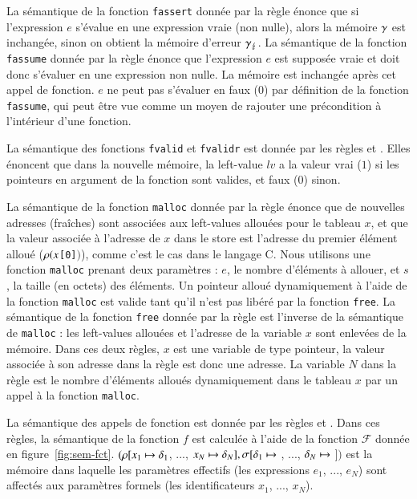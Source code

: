 La sémantique de la fonction \lstinline'fassert' donnée par la règle
 énonce que si l'expression $e$ s'évalue en une expression
vraie (non nulle), alors la mémoire $\gamma$ est inchangée, sinon on obtient
la mémoire d'erreur $\gamma_\lightning$.
La sémantique de la fonction \lstinline'fassume' donnée par la règle
 énonce que l'expression $e$ est supposée vraie et
doit donc s'évaluer en une expression non nulle.
La mémoire est inchangée après cet appel de fonction.
$e$ ne peut pas s'évaluer en faux ($0$) par définition de la fonction
\lstinline'fassume', qui peut être vue comme un moyen de rajouter une
précondition à l'intérieur d'une fonction.

La sémantique des fonctions \lstinline'fvalid' et \lstinline'fvalidr' est donnée
par les règles  et .
Elles énoncent que dans la nouvelle mémoire, la left-value $\mathit{lv}$ a
la valeur vrai ($1$) si les pointeurs en argument de la fonction sont valides,
et faux ($0$) sinon.

La sémantique de la fonction \lstinline'malloc' donnée par la règle
 énonce que de nouvelles adresses (fraîches) sont associées
aux left-values allouées pour le tableau $x$, et que la valeur
associée à l'adresse de $x$ dans le store est l'adresse du premier
élément alloué ($\rho(x$\lstinline'[0]'$)$), comme c'est le cas dans le langage
C.
Nous utilisons une fonction \lstinline'malloc' prenant deux paramètres :
$e$, le nombre d'éléments à allouer, et $s$, la taille (en octets) des éléments.
Un pointeur alloué dynamiquement à l'aide de la fonction \lstinline'malloc' est
valide tant qu'il n'est pas libéré par la fonction \lstinline'free'.
La sémantique de la fonction \lstinline'free' donnée par la règle
 est l'inverse de la sémantique de \lstinline'malloc' : les
left-values allouées et l'adresse de la variable $x$ sont enlevées de la
mémoire.
Dans ces deux règles, $x$ est une variable de type pointeur, la
valeur associée à son adresse dans la règle  est donc une
adresse.
La variable $N$ dans la règle  est le nombre d'éléments alloués
dynamiquement dans le tableau $x$ par un appel à la fonction \lstinline'malloc'.

La sémantique des appels de fonction est donnée par les règles 
et .
Dans ces règles, la sémantique de la fonction $f$ est calculée à
l'aide de la fonction $\mathcal{F}$ donnée en figure~\ref{fig:sem-fct}.
$(\rho[x_1 \mapsto \delta_1$, ...,
  $x_N \mapsto \delta_N], \sigma[\delta_1 \mapsto$
  , ...,
  $\delta_N \mapsto$  $])$
est la mémoire dans laquelle les paramètres effectifs (les expressions
$e_1$, ..., $e_N$) sont affectés aux paramètres formels (les identificateurs
$x_1$, ..., $x_N$).


